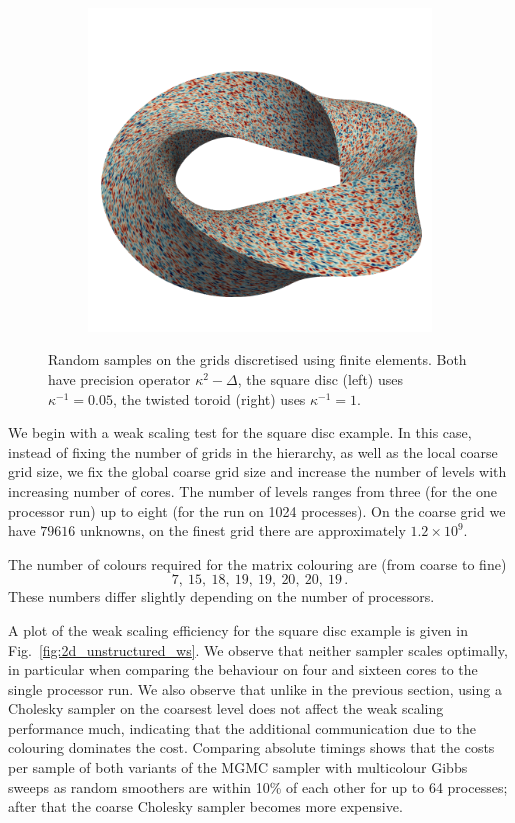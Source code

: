 \documentclass[
fontsize=11pt,
paper=a4,
numbers=noenddot
]{scrartcl}
\begin{document}
\begin{figure}[htbp]
\begin{subfigure}[b]{0.4\textwidth}
        \includegraphics[width=\textwidth]{plots/paraview/toroid_1.png}
      \end{subfigure}
      \caption{Random samples on the grids discretised using finite elements. Both have precision operator $\kappa^2 - \Delta $, the square disc (left) uses $\kappa^{-1} = 0.05$, the twisted toroid (right) uses $\kappa^{-1} = 1$.}
    \label{fig:mfem_ex}
\end{figure}

We begin with a weak scaling test for the square disc example. In this case, instead of fixing the number of grids in the hierarchy, as well as the local coarse grid size, we fix the global coarse grid size and increase the number of levels with increasing number of cores. The number of levels ranges from three (for the one processor run) up to eight (for the run on 1024 processes). On the coarse grid we have $79616$ unknowns, on the finest grid there are approximately $1.2 \times 10^9$.

The number of colours required for the matrix colouring are (from coarse to fine)
\begin{equation*}
  7,\ 15,\ 18,\ 19,\ 19,\ 20,\ 20,\ 19\,.
\end{equation*}
These numbers differ slightly depending on the number of processors.

A plot of the weak scaling efficiency for the square disc example is given in Fig.~\ref{fig:2d_unstructured_ws}. We observe that neither sampler scales optimally, in particular when comparing the behaviour on four and sixteen cores to the single processor run. We also observe that unlike in the previous section, using a Cholesky sampler on the coarsest level does not affect the weak scaling performance much, indicating that the additional communication due to the colouring dominates the cost. Comparing absolute timings shows that the costs per sample of both variants of the MGMC sampler with multicolour Gibbs sweeps as random smoothers are within 10\% of each other for up to 64 processes; after that the coarse Cholesky sampler becomes more expensive.
\end{document}
